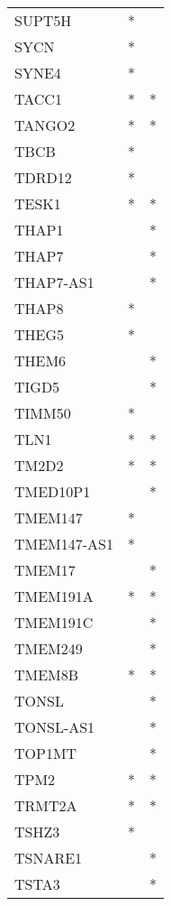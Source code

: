 \begin{longtable}{lcc}
SUPT5H       &         * &         \\
SYCN         &         * &         \\
SYNE4        &         * &         \\
TACC1        &         * &       * \\
TANGO2       &         * &       * \\
TBCB         &         * &         \\
TDRD12       &         * &         \\
TESK1        &         * &       * \\
THAP1        &           &       * \\
THAP7        &           &       * \\
THAP7-AS1    &           &       * \\
THAP8        &         * &         \\
THEG5        &         * &         \\
THEM6        &           &       * \\
TIGD5        &           &       * \\
TIMM50       &         * &         \\
TLN1         &         * &       * \\
TM2D2        &         * &       * \\
TMED10P1     &           &       * \\
TMEM147      &         * &         \\
TMEM147-AS1  &         * &         \\
TMEM17       &           &       * \\
TMEM191A     &         * &       * \\
TMEM191C     &           &       * \\
TMEM249      &           &       * \\
TMEM8B       &         * &       * \\
TONSL        &           &       * \\
TONSL-AS1    &           &       * \\
TOP1MT       &           &       * \\
TPM2         &         * &       * \\
TRMT2A       &         * &       * \\
TSHZ3        &         * &         \\
TSNARE1      &           &       * \\
TSTA3        &           &       * \\

\end{longtable}
